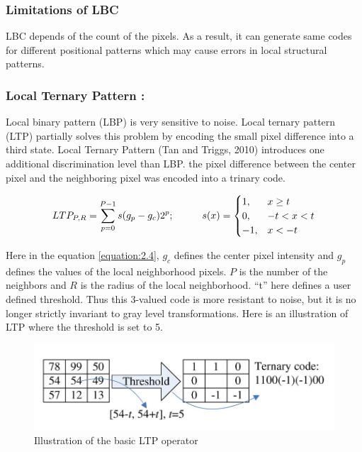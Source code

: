 \documentclass[12pt]{article}
\newcommand\tab[1][1cm]{\hspace*{#1}}
\begin{document}
\subsubsection*{Limitations of LBC}
LBC depends of the count of the pixels. As a result, it can generate same codes for different positional patterns which may cause errors in local structural patterns. \\

\subsubsection{Local Ternary Pattern :}

Local binary pattern (LBP) is very sensitive to noise. Local ternary pattern (LTP) partially solves this problem by encoding the small pixel difference into a third state. Local Ternary Pattern (Tan and Triggs, 2010)\cite{ltp02} introduces one additional discrimination level than LBP.  the
pixel difference between the center pixel and the neighboring
pixel was encoded into a trinary code.

\begin{equation}
LTP_{P,R}=\sum\limits_{p=0}^{P-1}{s({{g}_{p}}-{{g}_{c}}){{2}^{p}}}; \tab  s(x)= 
\begin{cases}
1,&  x\geq t\\
0,&  -t < x <t\\
-1,&  x<-t
\end{cases}
\label{equation:2.4}
\end{equation}

Here in the equation \ref{equation:2.4},  $g_c$ defines the center pixel intensity and $g_p$ defines the values of the local neighborhood pixels. $P$ is the number of the neighbors and $R$ is the radius of the local neighborhood. ``t'' here defines a user defined threshold. Thus this 3-valued code is more resistant to noise, but it is no longer strictly invariant to gray level transformations. Here is an illustration of LTP where the threshold is set to 5\cite{ltp03}.

\begin{figure}[h]
	\centering
	\includegraphics[width=\textwidth]{ltp_code1}
	\caption{Illustration of the basic LTP operator}
	\label{figure:2.7}
\end{figure}  
\end{document}
